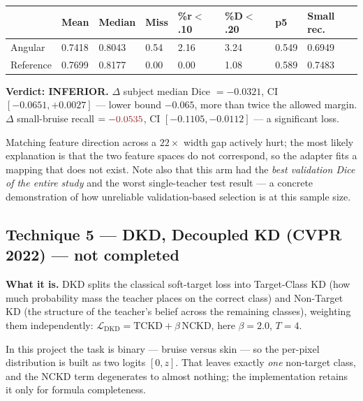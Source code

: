 \documentclass[11pt]{article}
\newcommand{\lose}[1]{\textcolor{losered}{#1}}
\begin{document}
\begin{center}\small
\begin{tabular}{K q q q q q q M}
\toprule
& \textbf{Mean} & \textbf{Median} & \textbf{Miss} & \textbf{\%r$<$.10} & \textbf{\%D$<$.20} &
\textbf{p5} & \textbf{Small rec.} \\
\midrule
Angular   & \lose{0.7418} & 0.8043 & 0.54 & 2.16 & 3.24 & 0.549 & \lose{0.6949} \\
Reference & 0.7699 & 0.8177 & 0.00 & 0.00 & 1.08 & 0.589 & 0.7483 \\
\bottomrule
\end{tabular}
\end{center}

\textbf{Verdict: \lose{INFERIOR}.}
$\Delta$ subject median Dice $=-0.0321$, CI $[-0.0651,+0.0027]$ --- lower bound $-0.065$, more than
twice the allowed margin. $\Delta$ small-bruise recall $=\lose{-0.0535}$, CI $[-0.1105,-0.0112]$
--- a significant loss.

Matching feature direction across a $22\times$ width gap actively hurt; the most likely explanation
is that the two feature spaces do not correspond, so the adapter fits a mapping that does not
exist. Note also that this arm had the \emph{best validation Dice of the entire study} and the
worst single-teacher test result --- a concrete demonstration of how unreliable validation-based
selection is at this sample size.

\subsection{Technique 5 --- DKD, Decoupled KD (CVPR 2022) --- not completed}

\textbf{What it is.} DKD splits the classical soft-target loss into Target-Class KD (how much
probability mass the teacher places on the correct class) and Non-Target KD (the structure of the
teacher's belief across the remaining classes), weighting them independently:
$\mathcal{L}_{\mathrm{DKD}}=\mathrm{TCKD}+\beta\,\mathrm{NCKD}$, here $\beta=2.0$, $T=4$.

In this project the task is binary --- bruise versus skin --- so the per-pixel distribution is
built as two logits $[0,z]$. That leaves exactly \emph{one} non-target class, and the NCKD term
degenerates to almost nothing; the implementation retains it only for formula completeness.
\end{document}
